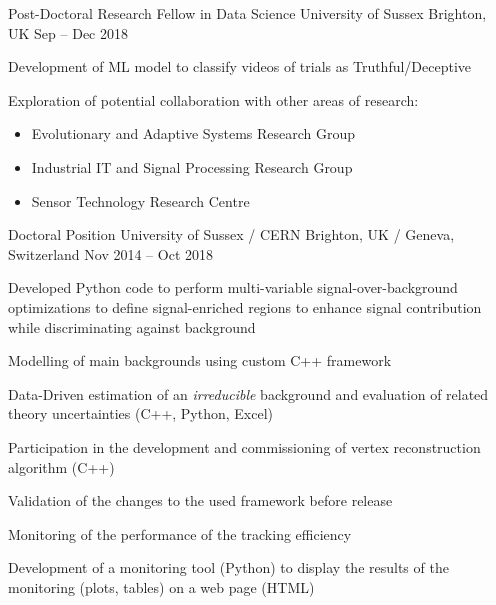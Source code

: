   \begin{cventries}
    \cventry
    {Post-Doctoral Research Fellow in Data Science}
    {University of Sussex}
    {Brighton, UK}
    {Sep -- Dec 2018}
    {
      \begin{cvitems}
        \item Development of ML model to classify videos of trials as Truthful/Deceptive
        \item Exploration of potential collaboration with other areas of research: 
        \begin{itemize}
          \item Evolutionary and Adaptive Systems Research Group
          \item Industrial IT and Signal Processing Research Group
          \item Sensor Technology Research Centre
        \end{itemize}
      \end{cvitems}
    }
  \end{cventries}

  \begin{cventries}    
    \cventry
    {Doctoral Position}
    {University of Sussex / CERN}
    {Brighton, UK / Geneva, Switzerland}
    {Nov 2014 -- Oct 2018}
    {
    \begin{cvitems}
      \item Developed Python code to perform multi-variable signal-over-background optimizations to define signal-enriched regions to enhance signal contribution while discriminating against background
      \item Modelling of main backgrounds using custom C++ framework
      \item Data-Driven estimation of an \emph{irreducible} background and evaluation of related theory uncertainties (C++, Python, Excel)
      \item Participation in the development and commissioning of vertex reconstruction algorithm (C++)
      \item Validation of the changes to the used framework before release
      \item Monitoring of the performance of the tracking efficiency
      \item Development of a monitoring tool (Python) to display the results of the monitoring (plots, tables) on a web page (HTML)
    \end{cvitems}
    }
  \end{cventries}

